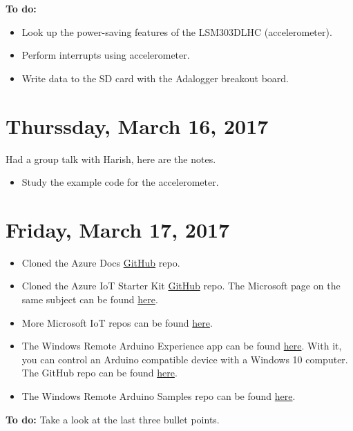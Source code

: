 \documentclass[12pt]{article}
\begin{document}
\textbf{To do:}
\begin{itemize}
\item Look up the power-saving features of the LSM303DLHC (accelerometer).
\item Perform interrupts using accelerometer.
\item Write data to the SD card with the Adalogger breakout board.
\end{itemize}

\section{Thurssday, March 16, 2017}
Had a group talk with Harish, here are the notes.
\begin{itemize}
\item Study the example code for the accelerometer.
\end{itemize}

\section{Friday, March 17, 2017}
\begin{itemize}
\item Cloned the Azure Docs \href{https://github.com/Microsoft/azure-docs}{GitHub} repo.
\item Cloned the Azure IoT Starter Kit \href{https://github.com/Azure-Samples/iot-hub-c-m0wifi-getstartedkit}{GitHub} repo. The Microsoft page on the same subject can be found \href{https://azure.microsoft.com/en-us/resources/samples/iot-hub-c-m0wifi-getstartedkit/}{here}.
\item More Microsoft IoT repos can be found \href{https://github.com/ms-iot}{here}.
\item The Windows Remote Arduino Experience app can be found \href{https://www.microsoft.com/store/apps/9nblggh2041m}{here}. With it, you can control an Arduino compatible device with a Windows 10 computer. The GitHub repo can be found \href{https://github.com/ms-iot/remote-wiring#notes-on-wifi-and-ethernet}{here}.
\item The Windows Remote Arduino Samples repo can be found \href{https://github.com/ms-iot/windows-remote-arduino-samples}{here}.
\end{itemize}

\textbf{To do:} Take a look at the last three bullet points.
\end{document}
